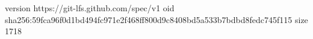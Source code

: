 version https://git-lfs.github.com/spec/v1
oid sha256:59fca96f0d1bd494fc971e2f468ff800d9c8408bd5a533b7bdbd8fedc745f115
size 1718
